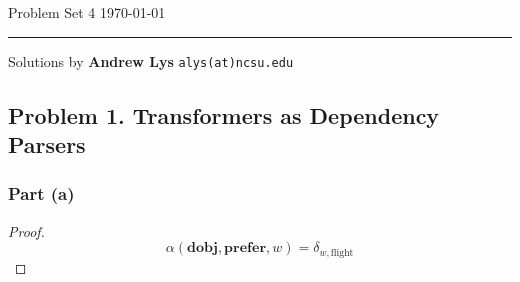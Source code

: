 \documentclass{amsart}
\theoremstyle{definition}
\begin{document}
\noindent
Problem Set 4  \hfill \today  %
\smallskip
\hrule
\smallskip
\noindent
Solutions by {\bf Andrew Lys} \qquad   %
  {\tt alys(at)ncsu.edu}

\vspace{0.5cm}
\subsection*{Problem 1. Transformers as Dependency Parsers}
\subsubsection*{Part (a)} 
\begin{proof}
    \[
    \alpha(\mathbf{dobj}, \mathbf{prefer}, w) = \delta_{w, \text{flight}}
    \]
\end{proof}
\end{document}
